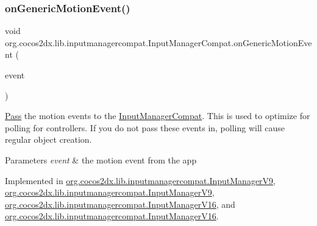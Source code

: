 \subsubsection{\texorpdfstring{on\+Generic\+Motion\+Event()}{onGenericMotionEvent()}\hspace{0.1cm}{\footnotesize\ttfamily [2/2]}}
{\footnotesize\ttfamily void org.\+cocos2dx.\+lib.\+inputmanagercompat.\+Input\+Manager\+Compat.\+on\+Generic\+Motion\+Event (\begin{DoxyParamCaption}\item[{Motion\+Event}]{event }\end{DoxyParamCaption})}

\hyperlink{classPass}{Pass} the motion events to the \hyperlink{interfaceorg_1_1cocos2dx_1_1lib_1_1inputmanagercompat_1_1InputManagerCompat}{Input\+Manager\+Compat}. This is used to optimize for polling for controllers. If you do not pass these events in, polling will cause regular object creation.


\begin{DoxyParams}{Parameters}
{\em event} & the motion event from the app \\
\hline
\end{DoxyParams}


Implemented in \hyperlink{classorg_1_1cocos2dx_1_1lib_1_1inputmanagercompat_1_1InputManagerV9_aa7e7451896e351e520f511388907fde9}{org.\+cocos2dx.\+lib.\+inputmanagercompat.\+Input\+Manager\+V9}, \hyperlink{classorg_1_1cocos2dx_1_1lib_1_1inputmanagercompat_1_1InputManagerV9_aa7e7451896e351e520f511388907fde9}{org.\+cocos2dx.\+lib.\+inputmanagercompat.\+Input\+Manager\+V9}, \hyperlink{classorg_1_1cocos2dx_1_1lib_1_1inputmanagercompat_1_1InputManagerV16_ab72ef0c7bf1fcc4cbd2f609d2e47f745}{org.\+cocos2dx.\+lib.\+inputmanagercompat.\+Input\+Manager\+V16}, and \hyperlink{classorg_1_1cocos2dx_1_1lib_1_1inputmanagercompat_1_1InputManagerV16_ab72ef0c7bf1fcc4cbd2f609d2e47f745}{org.\+cocos2dx.\+lib.\+inputmanagercompat.\+Input\+Manager\+V16}.

\mbox{\label{interfaceorg_1_1cocos2dx_1_1lib_1_1inputmanagercompat_1_1InputManagerCompat_a75e607a2bc756ca935665236f995dd0e}} 
